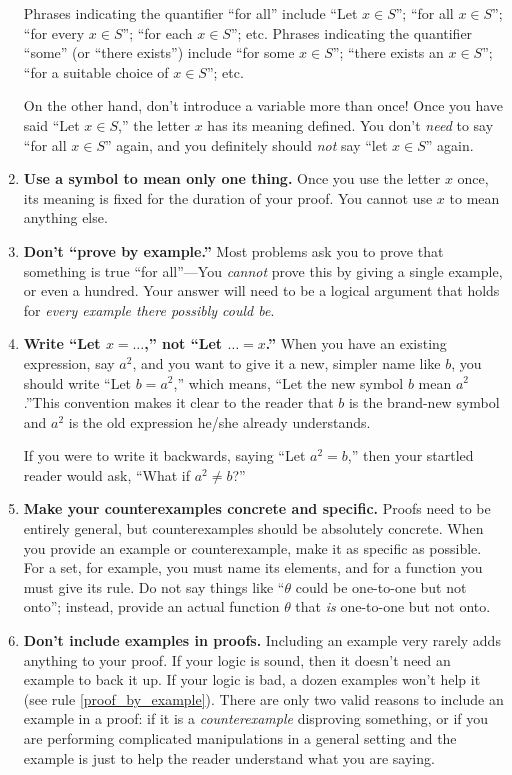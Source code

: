 \begin{enumerate}
Phrases indicating the quantifier ``for all'' include ``Let $x\in S$''; ``for all $x\in S$''; ``for every $x\in S$''; ``for each $x\in S$''; etc. Phrases indicating the quantifier ``some'' (or ``there exists'') include ``for some $x\in S$''; ``there exists an $x\in S$''; ``for a suitable choice of $x\in S$''; etc.

On the other hand, don't introduce a variable more than once! Once you have said ``Let $x\in S$,'' the letter $x$ has its meaning defined. You don't \emph{need} to say ``for all $x\in S$'' again, and you definitely should \emph{not} say ``let $x\in S$'' again.

\item \textbf{Use a symbol to mean only one thing.} Once you use the letter $x$ once, its meaning is fixed for the duration of your proof. You cannot use $x$ to mean anything else.

\item \textbf{Don't ``prove by example.''}\label{proof_by_example} Most problems ask you to prove that something is true ``for all''---You \emph{cannot} prove this by giving a single example, or even a hundred. Your answer will need to be a logical argument that holds for \emph{every example there possibly could be}.

\item \textbf{Write ``Let $x=\dots$,'' not ``Let $\dots=x$.''} When you have an existing expression, say $a^{2}$, and you want to give it a new, simpler name like $b$, you should write ``Let $b=a^{2}$,'' which means, ``Let the new symbol $b$ mean $a^{2}$.''This convention makes it clear to the reader that $b$ is the brand-new symbol and $a^{2}$ is the old expression he/she already understands.

If you were to write it backwards, saying ``Let $a^{2}=b$,'' then your startled reader would ask, ``What if $a^{2}\neq b$?''
  
\item \textbf{Make your counterexamples concrete and specific.} Proofs need to be entirely general, but counterexamples should be absolutely concrete. When you provide an example or counterexample, make it as specific as possible. For a set, for example, you must name its elements, and for a function you must give its rule. Do not say things like ``$\theta$ could be one-to-one but not onto'';
instead, provide an actual function $\theta$ that \emph{is} one-to-one but not onto.
    
\item \textbf{Don't include examples in proofs.} Including an example very rarely adds anything to your proof. If your logic is sound, then it doesn't need an example to back it up. If your logic is bad, a dozen examples won't help it (see rule \ref{proof_by_example}). There are only two valid reasons to include an example in a proof: if it is a \emph{counterexample} disproving something, or if you are performing complicated manipulations in a general setting and the example is just to help the reader understand what you are saying.


\end{enumerate}
